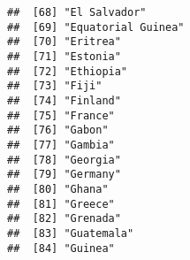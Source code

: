 \documentclass[
]{article}
\begin{document}
\begin{verbatim}
##  [68] "El Salvador"                                                                                                                                          
##  [69] "Equatorial Guinea"                                                                                                                                    
##  [70] "Eritrea"                                                                                                                                              
##  [71] "Estonia"                                                                                                                                              
##  [72] "Ethiopia"                                                                                                                                             
##  [73] "Fiji"                                                                                                                                                 
##  [74] "Finland"                                                                                                                                              
##  [75] "France"                                                                                                                                               
##  [76] "Gabon"                                                                                                                                                
##  [77] "Gambia"                                                                                                                                               
##  [78] "Georgia"                                                                                                                                              
##  [79] "Germany"                                                                                                                                              
##  [80] "Ghana"                                                                                                                                                
##  [81] "Greece"                                                                                                                                               
##  [82] "Grenada"                                                                                                                                              
##  [83] "Guatemala"                                                                                                                                            
##  [84] "Guinea"                                                                                                                                               

\end{verbatim}
\end{document}
